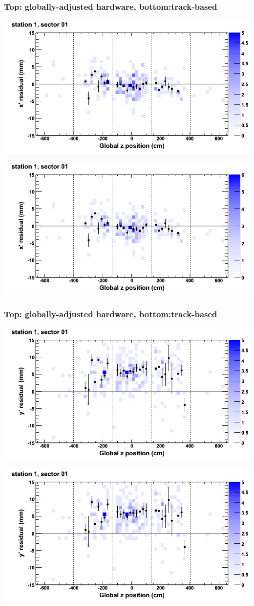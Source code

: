 \documentclass[compress]{beamer}
\begin{document}
\begin{frame}
\frametitle{Top: globally-adjusted hardware, bottom:track-based}
\includegraphics[width=0.7\linewidth]{NOV4_mapplots_HW/DTvsz_st1sec01_x.png}

\includegraphics[width=0.7\linewidth]{NOV4_mapplots/DTvsz_st1sec01_x.png}
\end{frame}

\begin{frame}
\frametitle{Top: globally-adjusted hardware, bottom:track-based}
\includegraphics[width=0.7\linewidth]{NOV4_mapplots_HW/DTvsz_st1sec01_y.png}

\includegraphics[width=0.7\linewidth]{NOV4_mapplots/DTvsz_st1sec01_y.png}
\end{frame}
\end{document}
